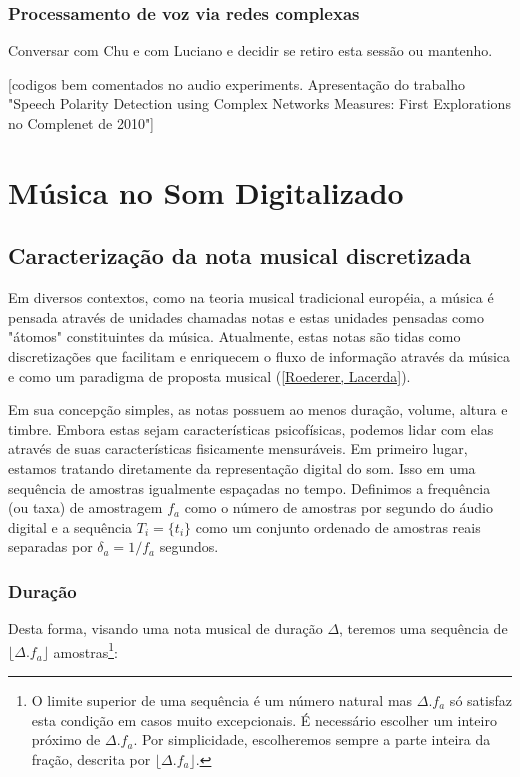      \subsubsection{Processamento de voz via redes complexas}
Conversar com Chu e com Luciano e decidir se retiro esta sessão ou mantenho.

      [codigos bem comentados no audio experiments. Apresentação do trabalho "Speech Polarity Detection using Complex Networks Measures: First Explorations no Complenet de 2010"]



\section{Música no Som Digitalizado}

\subsection{Caracterização da nota musical discretizada}
Em diversos contextos, como na teoria musical tradicional européia,
a música é pensada através de 
unidades chamadas notas e 
estas unidades pensadas como "átomos" constituintes da música.
Atualmente, estas notas
são tidas como discretizações
que facilitam e enriquecem o fluxo de informação através da música 
e como um paradigma de proposta musical (\ref{Roederer, Lacerda}).

Em sua concepção
simples, as notas possuem ao menos duração, volume, altura e timbre. Embora estas
sejam características psicofísicas, podemos lidar com elas através de suas características
fisicamente mensuráveis.
Em primeiro lugar, estamos tratando diretamente da representação digital do som. Isso em uma
sequência de amostras igualmente espaçadas no tempo. Definimos a
frequência (ou taxa) de amostragem $f_a$ como o número de amostras por segundo do áudio digital e
a sequência $T_i=\{t_i\}$ como um conjunto ordenado de amostras reais separadas por $\delta_a=1/f_a$ segundos.


\subsubsection{Duração}
Desta forma, visando uma nota musical de duração $\Delta$,
teremos uma sequência de $ \lfloor \Delta . f_a \rfloor $ amostras\footnote{O
limite superior de uma sequência é um número natural mas $ \Delta . f_a $
só satisfaz esta condição em casos muito excepcionais. É necessário
escolher um inteiro próximo de $\Delta . f_a$. Por simplicidade,
escolheremos sempre a parte inteira da fração, descrita por $\lfloor \Delta . f_a \rfloor$.}:

